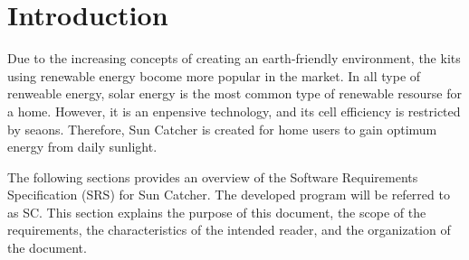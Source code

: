 \documentclass[12pt]{article}
\begin{document}

\section{Introduction}

\medskip

Due to the increasing concepts of creating an earth-friendly environment, the kits using renewable energy bocome more popular in the market. In all type of renweable energy, solar energy is the most common type of renewable resourse for a home. However, it is an enpensive technology, and its cell efficiency is restricted by seaons. Therefore, Sun Catcher is created for home users to gain optimum energy from daily sunlight.


The following sections provides an overview of the Software Requirements Specification
(SRS) for Sun Catcher. The developed program will be referred to as SC. This section explains the purpose of this document, the scope of the requirements, the characteristics of the intended reader, and the organization of the document.

\end{document}
